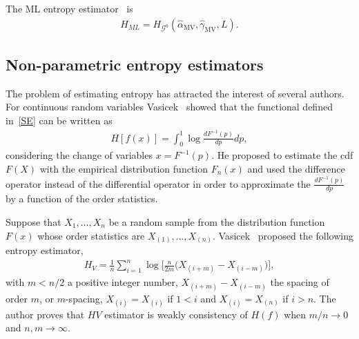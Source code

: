 \documentclass[journal]{IEEEtran}
\begin{document}
	The ML entropy estimator~\cite{CaseBerg01} is
	\begin{align}
		H_{ML}=H_{\mathcal G^0}(\widehat{\alpha}_{\text{MV}},\widehat{\gamma}_{\text{MV}},L).
	\end{align}
	
	
	
	
	\subsection{Non-parametric entropy estimators}
	\label{Hest}
	
	The problem of estimating entropy has attracted the interest of several authors. For continuous random variables Vasicek~\cite{Vasicek76} showed that the functional defined in~\eqref{SE} can be written as
	\begin{align}
	H[f(x)]=\int_{0}^{1} \log \frac{d F^{-1}(p)}{d p} d p,
	\end{align}
	considering the change of variables $x=F^{-1}(p).$
	He proposed to estimate the cdf $F(X)$ with the empirical distribution function $F_n(x)$ and used the difference operator instead of the differential operator in order to approximate the $\frac{d F^{-1}(p)}{d p}$ by a function of the order statistics.
	
	Suppose that $X_1,\dots,X_n$ be a random sample from the distribution function $F(x)$ whose order statistics are $X_{(1)}, \ldots, X_{(n)}$. 
	Vasicek~\cite{Vasicek76} proposed the following entropy estimator,
	\begin{align}
	\label{HV}
		H_{V}=\frac{1}{n} \sum_{i=1}^{n} \log \Big[\frac{n}{2 m}\big(X_{(i+m)}-X_{(i-m)}\big)\Big], 
	\end{align}
	with $m<n/2$ a positive integer number, $X_{(i+m)}-X_{(i-m)}$ the spacing of order $m$, or $m$-spacing, $X_{(i)}=X_{(i)}$ if $1<i$ and $X_{(i)}=X_{(n)}$ if $i>n$.
	The author proves that $HV$ estimator is weakly consistency of $H(f)$ when $m/n \to 0$ and $n,m \to \infty$.
	
\end{document}
